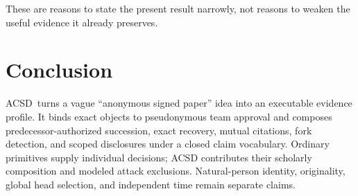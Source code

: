 \documentclass[acmsmall,screen,review,nonacm]{acmart}
\newcommand{\acsd}{\textsc{ACSD}}
\begin{document}
These are reasons to state the present result narrowly, not reasons to weaken the useful evidence it already preserves.

\section{Conclusion}

\acsd\ turns a vague ``anonymous signed paper'' idea into an executable evidence profile. It binds exact objects to pseudonymous team approval and composes predecessor-authorized succession, exact recovery, mutual citations, fork detection, and scoped disclosures under a closed claim vocabulary. Ordinary primitives supply individual decisions; ACSD contributes their scholarly composition and modeled attack exclusions. Natural-person identity, originality, global head selection, and independent time remain separate claims.
\end{document}
